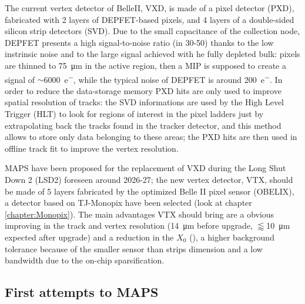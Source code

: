         The current vertex detector of BelleII, VXD, is made of a pixel detector (PXD), fabricated with 2 layers of DEPFET-based pixels, and 4 layers of a double-sided silicon strip detectors (SVD)\cite{BelleII-DEPFET}.
        Due to the small capacitance of the collection node, DEPFET presents a high signal-to-noise ratio (in 30-50) thanks to the low instrinsic noise and to the large signal achieved with he fully depleted bulk: pixels are thinned to \SI{75}{\um} in the active region, then a MIP is supposed to create a signal of $\sim$\SI{6000}{e^-}, while the typical noise of DEPFET is around \SI{200}{e^-}.
        In order to reduce the data-storage memory PXD hits are only used to improve spatial resolution of tracks: the SVD informations are used by the High Level Trigger (HLT) to look for regions of interest in the pixel ladders just by extrapolating back the tracks found in the tracker detector, and this method allows to store only data belonging to these areas; the PXD hits are then used in offline track fit to improve the vertex resolution.
        
        MAPS have been proposed for the replacement of VXD during the  Long Shut Down 2 (LSD2) foreseen around 2026-27; the new vertex detector, VTX, should be made of 5 layers fabricated by the optimized Belle II pixel sensor (OBELIX), a detector based on TJ-Monopix have been selected (look at chapter \ref{chapter:Monopix}).    
        The main advantages VTX should bring are a obvious improving in the track and vertex resolution (\SI{14}{\um} before upgrade, $\lessapprox$\SI{10}{\um} expected after upgrade) and a reduction in the $X_0$ (), a higher background tolerance because of the smaller sensor than strips dimension and a low bandwidth due to the on-chip sparsification. 

    \subsection{First attempts to MAPS}
